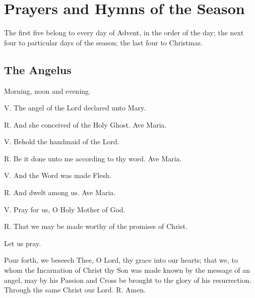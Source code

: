 \section{Prayers and Hymns of the Season}\label{sec:prayers}

The first five belong to every day of Advent, in the order of the day; the
next four to particular days of the season; the last four to Christmas.

\subsection{The Angelus}

Morning, noon and evening.

\noindent{}\par
\noindent{}\par
\noindent{}\par
\noindent{}\par
\noindent{}\par
\noindent{}\par
\noindent{}\par
\noindent{}\par
\noindent{}\par
\noindent{}\par
\medskip

\noindent V. The angel of the Lord declared unto Mary.\par
\noindent R. And she conceived of the Holy Ghost. Ave Maria.\par
\noindent V. Behold the handmaid of the Lord.\par
\noindent R. Be it done unto me according to thy word. Ave Maria.\par
\noindent V. And the Word was made Flesh.\par
\noindent R. And dwelt among us. Ave Maria.\par
\noindent V. Pray for us, O Holy Mother of God.\par
\noindent R. That we may be made worthy of the promises of Christ.\par
\noindent Let us pray.\par
\noindent Pour forth, we beseech Thee, O Lord, thy grace into our hearts; that we, to whom the Incarnation of Christ thy Son was made known by the message of an angel, may by his Passion and Cross be brought to the glory of his resurrection. Through the same Christ our Lord. R. Amen.\par

